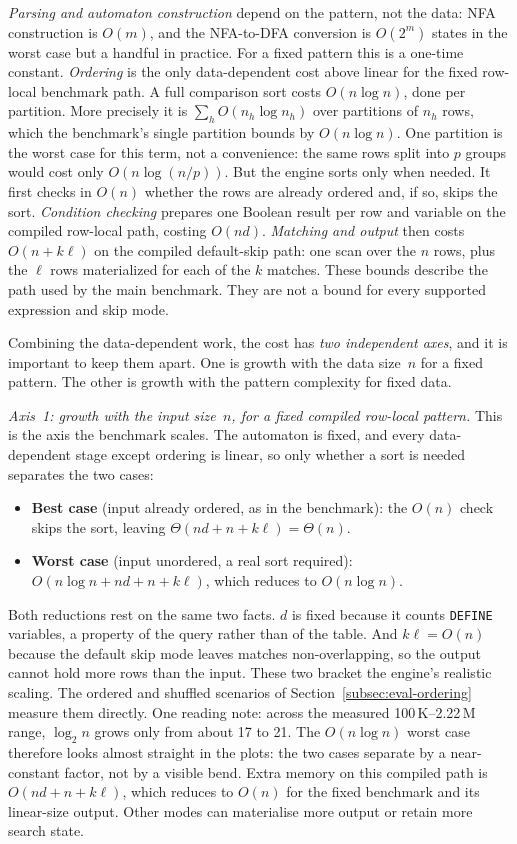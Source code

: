 \emph{Parsing and automaton construction} depend on the pattern,
not the data: NFA construction is $O(m)$, and the NFA-to-DFA
conversion is $O(2^{m})$ states in the worst case but a handful in
practice.  For a fixed pattern this is a one-time constant.
\emph{Ordering} is the only data-dependent cost above
linear for the fixed row-local benchmark path.  A full comparison sort
costs $O(n \log n)$, done per partition.  More
precisely it is $\sum_h O(n_h \log n_h)$ over partitions of $n_h$ rows, which
the benchmark's single partition bounds by $O(n \log n)$.  One
partition is the worst case for this term, not a convenience: the same
rows split into $p$ groups would cost only $O(n \log(n/p))$.  But the
engine sorts only when needed.  It first checks in $O(n)$ whether the
rows are already ordered and, if so, skips the sort.
\emph{Condition checking} prepares one Boolean result per row
and variable on the compiled row-local path, costing $O(nd)$.
\emph{Matching and output} then costs $O(n+k\ell)$ on the
compiled default-skip path: one scan over the $n$ rows, plus the $\ell$
rows materialized for each of the $k$ matches.  These bounds describe the path used by the main
benchmark.  They are not a bound for every supported expression and
skip mode.

Combining the data-dependent work, the cost has \emph{two independent
axes}, and it is important to keep them apart.  One is growth with the
data size~$n$ for a fixed pattern.  The other is growth with the pattern
complexity for fixed data.


\emph{Axis~1: growth with the input size~$n$, for a fixed compiled
row-local pattern.}  This is the axis the benchmark scales.  The
automaton is fixed, and every data-dependent stage except ordering is
linear, so only whether a sort is needed separates the two cases:
\begin{itemize}
  \item \textbf{Best case} (input already ordered, as in the
    benchmark): the $O(n)$ check skips the sort, leaving
    $\Theta(nd+n+k\ell)=\Theta(n)$.
  \item \textbf{Worst case} (input unordered, a real sort required):
    $O(n \log n + nd + n + k\ell)$, which reduces to $O(n\log n)$.
\end{itemize}
Both reductions rest on the same two facts.  $d$ is fixed because it
counts \texttt{DEFINE} variables, a property of the query rather than
of the table.  And $k\ell=O(n)$ because the default skip mode leaves
matches non-overlapping, so the output cannot hold more rows than the
input.
These two bracket the engine's realistic scaling.  The ordered and
shuffled scenarios of Section~\ref{subsec:eval-ordering} measure them
directly.  One reading note: across the measured 100\,K--2.22\,M range,
$\log_2 n$ grows only from about 17 to 21.  The $O(n\log n)$ worst case
therefore looks almost straight in the plots: the two cases separate by
a near-constant factor, not by a visible bend.  Extra memory on this
compiled path is $O(nd+n+k\ell)$, which reduces to $O(n)$ for the
fixed benchmark and its linear-size output.  Other modes can
materialise more output or retain more search state.

